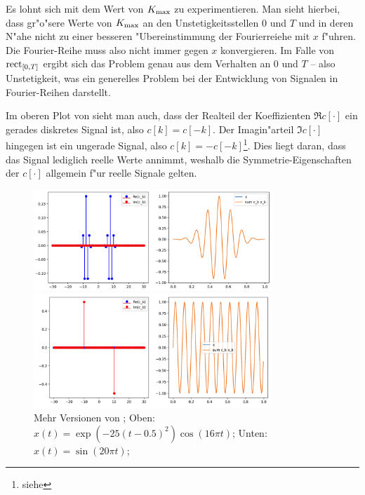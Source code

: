 Es lohnt sich mit dem Wert von $K_{\rm max}$ zu experimentieren. 
Man sieht hierbei, dass gr"o"sere Werte von $K_{\rm max}$ an den Unstetigkeitsstellen $0$ und $T$ und in deren N"ahe nicht zu einer besseren "Ubereinstimmung der Fourierreiehe mit $x$ f"uhren.
Die Fourier-Reihe muss also nicht immer gegen $x$ konvergieren.
Im Falle von $\operatorname*{rect}_{[0,T]}$ ergibt sich das Problem genau aus dem Verhalten an $0$ und $T$ -- also Unstetigkeit, was ein generelles Problem bei der Entwicklung von Signalen in Fourier-Reihen darstellt.

Im oberen Plot von  sieht man auch, dass der Realteil der Koeffizienten $\Re{c[\cdot]}$ ein gerades diskretes Signal ist, also $c[k] = c[-k]$.
Der Imagin"arteil $\Im{c[\cdot]}$ hingegen ist ein ungerade Signal, also $c[k] = -c[-k]$\footnote{siehe }. 
Dies liegt daran, dass das Signal lediglich reelle Werte annimmt, weshalb die Symmetrie-Eigenschaften der $c[\cdot]$ allgemein f"ur reelle Signale gelten.

\begin{figure}
    \begin{center}
        \includegraphics[width=0.8\textwidth]{code/fourier_series_1.png}

        \includegraphics[width=0.8\textwidth]{code/fourier_series_2.png}
    \end{center}
    \caption{Mehr Versionen von ; Oben: $x(t) = \exp(-25(t-0.5)^2) \cos(16 \pi t)$; Unten: $x(t) = \sin(20 \pi t)$;}\label{fig:fourier:fourier_series}
\end{figure}

